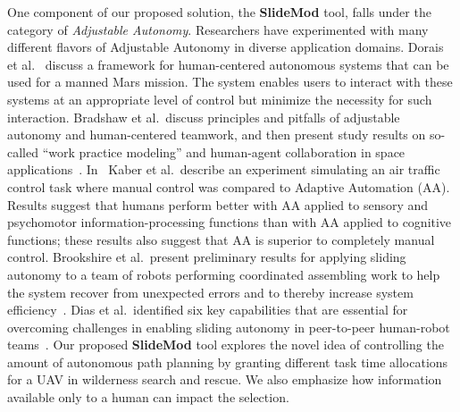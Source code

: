 One component of our proposed solution, the \textbf{SlideMod} tool, falls under the category of \textit{Adjustable Autonomy}. Researchers have experimented with many different flavors of Adjustable Autonomy in diverse application domains. Dorais et al.\ \cite{Dorais1998AdjustableAutonomy} discuss a framework for human-centered autonomous systems that can be used for a manned Mars mission. The system enables users to interact with these systems at an appropriate level of control but minimize the necessity for such interaction. Bradshaw et al.\ discuss principles and pitfalls of adjustable autonomy and human-centered teamwork, and then present study results on so-called ``work practice modeling'' and human-agent collaboration in space applications~\cite{Bradshaw2003AdjustableAutonomy}. In~\cite{Kaber2005Adaptive} Kaber et al.\ describe an experiment simulating an air traffic control task where manual control was compared to Adaptive Automation (AA). Results suggest that humans perform better with AA applied to sensory and psychomotor information-processing functions than with AA applied to cognitive functions; these results also suggest that AA is superior to completely manual control. Brookshire et al.\ present preliminary results for applying sliding autonomy to a team of robots performing coordinated assembling work to help the system recover from unexpected errors and to thereby increase system efficiency~\cite{Brookshire2004Preliminary}. Dias et al.\ identified six key capabilities that are essential for overcoming challenges in enabling sliding autonomy in peer-to-peer human-robot teams~\cite{Dias2008SlidingAutonomy}. Our proposed \textbf{SlideMod} tool explores the novel idea of controlling the amount of autonomous path planning by granting different task time allocations for a UAV in wilderness search and rescue. We also emphasize how information available only to a human can impact the selection.

